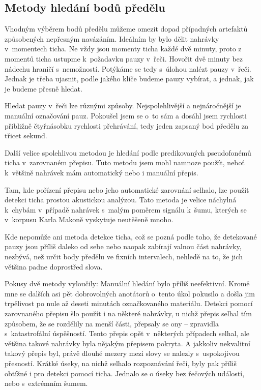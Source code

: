 \subsection{Metody hledání bodů předělu}

Vhodným výběrem bodů předělu můžeme omezit dopad případných artefaktů
způsobených nepřesným navázáním. Ideálním by bylo dělit nahrávky v~momentech
ticha. Ne vždy jsou momenty ticha každé dvě minuty, proto z momentů ticha
ustupme k~požadavku pauzy v~řeči. Hovořit dvě minuty bez nádechu hraničí
s~nemožností. Potýkáme se tedy s~úlohou nalézt pauzy v~řeči. Jednak je třeba
ujasnit, podle jakého klíče budeme pauzy vybírat, a jednak, jak je budeme přesně
hledat.

Hledat pauzy v~řeči lze různými způsoby. Nejspolehlivější a nejnáročnější je
manuální označování pauz. Pokoušel jsem se o~to sám a dosáhl jsem rychlosti
přibližně čtyřnásobku rychlosti přehrávání, tedy jeden zapsaný bod předělu za
třicet sekund.

Další velice spolehlivou metodou je hledání podle predikovaných pseudofonémů
ticha v~zarovnaném přepisu. Tuto metodu jsem mohl namnoze použít, neboť
k~většině nahrávek mám automatický nebo i manuální přepis.

Tam, kde pořízení přepisu nebo jeho automatické zarovnání selhalo, lze použít
detekci ticha prostou akustickou analýzou. Tato metoda je velice náchylná
k~chybám v~případě nahrávek s~malým poměrem signálu k~šumu, kterých se v~korpusu
Karla Makoně vyskytuje neutěšeně mnoho.

Kde nepomůže ani metoda detekce ticha, což se pozná podle toho, že detekované
pauzy jsou příliš daleko od sebe nebo naopak zabírají valnou část nahrávky,
nezbývá, než určit body předělu ve fixních intervalech, nehledě na to, že jich
většina padne doprostřed slova.

Pokusy dvě metody vyloučily: Manuální hledání bylo příliš neefektivní. Kromě mne
se dalších asi pět dobrovolných anotátorů o~tento úkol pokusilo a došla jim
trpělivost po nule až deseti minutách označkovaného materiálu. Detekci pomocí
zarovnaného přepisu šlo použít i na některé nahrávky, u nichž přepis selhal tím
způsobem, že se rozdělily na menší části, přepsaly se ony -- zpravidla
s~katastrofální úspěšností. Tento přepis opět v~některých případech selhal, ale
většina takové nahrávky byla nějakým přepisem pokryta. A jakkoliv nekvalitní
takový přepis byl, právě dlouhé mezery mezi slovy se nalezly s~uspokojivou
přesností. Krátké úseky, na nichž selhalo rozpoznávání řeči, byly pak příliš
obtížné i pro detekci pomocí ticha. Jednalo se o úseky bez řečových událostí,
nebo s~extrémním šumem.


